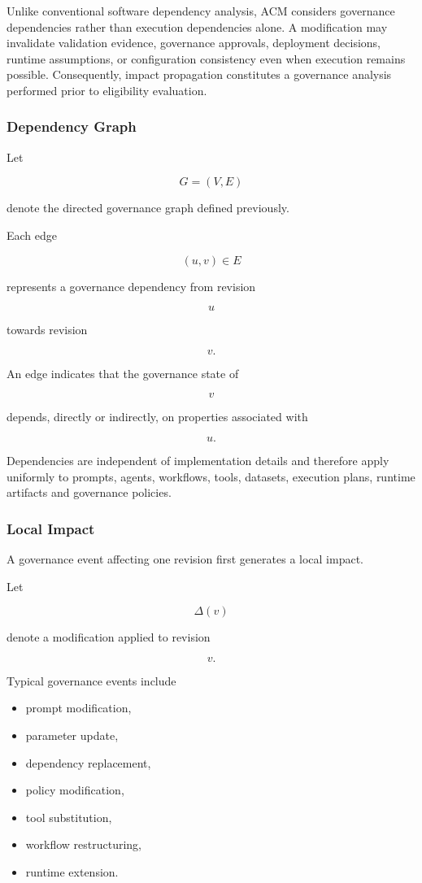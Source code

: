 \documentclass[10pt]{article}
\begin{document}
Unlike conventional software dependency analysis, ACM considers governance
dependencies rather than execution dependencies alone. A modification may
invalidate validation evidence, governance approvals, deployment decisions,
runtime assumptions, or configuration consistency even when execution remains
possible. Consequently, impact propagation constitutes a governance analysis
performed prior to eligibility evaluation.

\subsubsection{Dependency Graph}

Let

\[
G=(V,E)
\]

denote the directed governance graph defined previously.

Each edge

\[
(u,v)\in E
\]

represents a governance dependency from revision

\[
u
\]

towards revision

\[
v.
\]

An edge indicates that the governance state of

\[
v
\]

depends, directly or indirectly, on properties associated with

\[
u.
\]

Dependencies are independent of implementation details and therefore apply
uniformly to prompts, agents, workflows, tools, datasets, execution plans,
runtime artifacts and governance policies.

\subsubsection{Local Impact}

A governance event affecting one revision first generates a local impact.

Let

\[
\Delta(v)
\]

denote a modification applied to revision

\[
v.
\]

Typical governance events include

\begin{itemize}
    \item prompt modification,
    \item parameter update,
    \item dependency replacement,
    \item policy modification,
    \item tool substitution,
    \item workflow restructuring,
    \item runtime extension.
\end{itemize}
\end{document}
